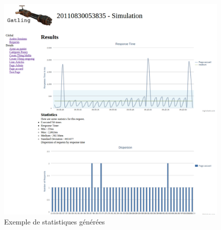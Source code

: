 \begin{figure}[h]
\begin{center}
\includegraphics{img/stats_exp.png}
\end{center}
\caption{Exemple de statistiques générées}
\label{stats_gen}
\end{figure}